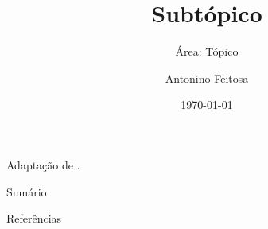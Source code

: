 \documentclass[compress]{beamer}
\title{Subtópico}
\subtitle{Área: Tópico}
\author{Antonino Feitosa}
\institute[]{ \\ \smallskip \textit{\href{mailto:antonino\_feitosa@yahoo.com.br}{antonino\_feitosa@yahoo.com.br}}}
\date{\today}
\begin{document}
    \begin{frame}[noframenumbering]
        \titlepage
        Adaptação de \cite{referência}.
    \end{frame}
    \begin{frame}[noframenumbering]{Sumário}
        \tableofcontents
    \end{frame}
    








    \appendix
    \begin{frame}{Referências}
        \printbibliography
    \end{frame}
\end{document}
